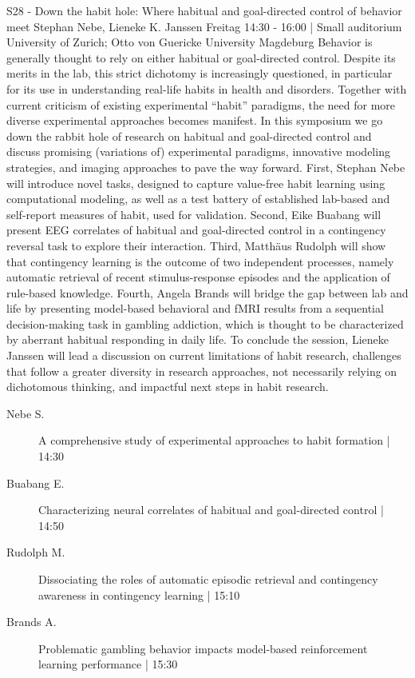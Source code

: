 
            \begin{symposium}
            {S28 - Down the habit hole: Where habitual and goal-directed control of behavior meet}
            {Stephan Nebe, Lieneke K. Janssen}
            {Freitag 14:30 - 16:00 | Small auditorium}
            {University of Zurich; Otto von Guericke University Magdeburg}
            Behavior is generally thought to rely on either habitual or goal-directed control. Despite its merits in the lab, this strict dichotomy is increasingly questioned, in particular for its use in understanding real-life habits in health and disorders. Together with current criticism of existing experimental “habit” paradigms, the need for more diverse experimental approaches becomes manifest. In this symposium we go down the rabbit hole of research on habitual and goal-directed control and discuss promising (variations of) experimental paradigms, innovative modeling strategies, and imaging approaches to pave the way forward. First, Stephan Nebe will introduce novel tasks, designed to capture value-free habit learning using computational modeling, as well as a test battery of established lab-based and self-report measures of habit, used for validation. Second, Eike Buabang will present EEG correlates of habitual and goal-directed control in a contingency reversal task to explore their interaction. Third, Matthäus Rudolph will show that contingency learning is the outcome of two independent processes, namely automatic retrieval of recent stimulus-response episodes and the application of rule-based knowledge. Fourth, Angela Brands will bridge the gap between lab and life by presenting model-based behavioral and fMRI results from a sequential decision-making task in gambling addiction, which is thought to be characterized by aberrant habitual responding in daily life. To conclude the session, Lieneke Janssen will lead a discussion on current limitations of habit research, challenges that follow a greater diversity in research approaches, not necessarily relying on dichotomous thinking, and impactful next steps in habit research.
            \begin{description}    
            
                \item [ Nebe S.] A comprehensive study of experimental approaches to habit formation \textcolor{mygray}{ | 14:30}    
                
                \item [ Buabang E.] Characterizing neural correlates of habitual and goal-directed control \textcolor{mygray}{ | 14:50}    
                
                \item [ Rudolph M.] Dissociating the roles of automatic episodic retrieval and contingency awareness in contingency learning \textcolor{mygray}{ | 15:10}    
                
                \item [ Brands A.] Problematic gambling behavior impacts model-based reinforcement learning performance \textcolor{mygray}{ | 15:30}    
                
            \end{description} 
            \end{symposium}
            
